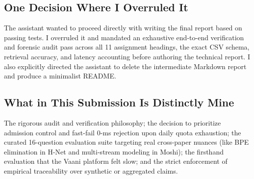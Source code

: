 \documentclass[9pt,a4paper]{article}
\begin{document}
\subsection*{One Decision Where I Overruled It}
The assistant wanted to proceed directly with writing the final report based on passing tests. I overruled it and mandated an exhaustive end-to-end verification and forensic audit pass across all 11 assignment headings, the exact CSV schema, retrieval accuracy, and latency accounting before authoring the technical report. I also explicitly directed the assistant to delete the intermediate Markdown report and produce a minimalist README.

\subsection*{What in This Submission Is Distinctly Mine}
The rigorous audit and verification philosophy; the decision to prioritize admission control and fast-fail 0-ms rejection upon daily quota exhaustion; the curated 16-question evaluation suite targeting real cross-paper nuances (like BPE elimination in H-Net and multi-stream modeling in Moshi); the firsthand evaluation that the Vaani platform felt slow; and the strict enforcement of empirical traceability over synthetic or aggregated claims.
\end{document}
